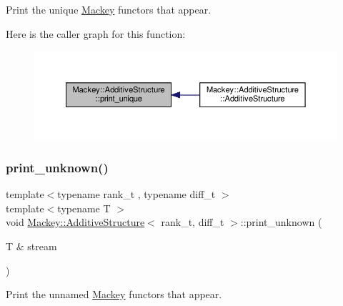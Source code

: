 Print the unique \hyperlink{namespaceMackey}{Mackey} functors that appear. 

Here is the caller graph for this function\+:\nopagebreak
\begin{figure}[H]
\begin{center}
\leavevmode
\includegraphics[width=350pt]{classMackey_1_1AdditiveStructure_a82ea44d284efe410fb5d43c6a41dd3ed_icgraph}
\end{center}
\end{figure}
\mbox{\label{classMackey_1_1AdditiveStructure_a6c68d66e89c3ad3a81dde8fd35837c3c}} 
\subsubsection{\texorpdfstring{print\+\_\+unknown()}{print\_unknown()}}
{\footnotesize\ttfamily template$<$typename rank\+\_\+t , typename diff\+\_\+t $>$ \\
template$<$typename T $>$ \\
void \hyperlink{classMackey_1_1AdditiveStructure}{Mackey\+::\+Additive\+Structure}$<$ rank\+\_\+t, diff\+\_\+t $>$\+::print\+\_\+unknown (\begin{DoxyParamCaption}\item[{T \&}]{stream }\end{DoxyParamCaption})}



Print the unnamed \hyperlink{namespaceMackey}{Mackey} functors that appear. 

